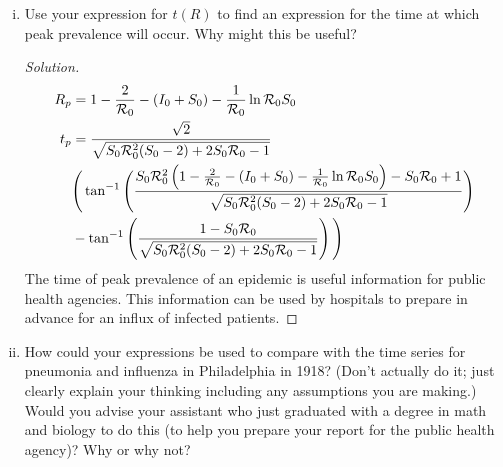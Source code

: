 \documentclass[12pt]{article}
\begin{document}
\begin{enumerate}[(a)]
\begin{enumerate}[(i)]
{\begin{proof}[Solution]
{}
\end{proof}
}

\item Use your expression for $t(R)$ to find an expression for the time at which peak prevalence will occur.  Why might this be useful?

{\color{blue}
\begin{proof}[Solution]
{\color{magenta}

\begin{align}
		R_p &= 1- \frac{2}{{\cal R}_0} - (I_0+S_0) - \frac{1}{{\cal R}_0} \ln{{\cal R}_0 S_0}  \\
		t_p &= \frac{\sqrt{2}}{\sqrt{S_0{\cal R}_0^2(S_0-2)+2S_0{\cal R}_0 -1}} \nonumber \\
		&  \Bigg ( \tan ^{-1} \Bigg ( \frac{S_0{\cal R}_0^2 \left ( 1- \frac{2}{{\cal R}_0} - (I_0+S_0) - \frac{1}{{\cal R}_0} \ln{{\cal R}_0 S_0}  \right ) - S_0{\cal R}_0 +1}{\sqrt{S_0{\cal R}_0^2(S_0-2)+2S_0{\cal R}_0 -1}} \Bigg ) \nonumber \\
		&-\tan ^{-1} \left ( \frac{1 - S_0{\cal R}_0 }{\sqrt{S_0{\cal R}_0^2(S_0-2)+2S_0{\cal R}_0 -1}} \right )  \Bigg ) 
	\end{align}
	The time of peak prevalence of an epidemic is useful information for public health agencies. This information can be used by hospitals to prepare in advance for an influx of infected patients. 

}
\end{proof}
}

\item How could your expressions be used to compare with the time series for pneumonia and influenza in Philadelphia in 1918?  (Don't actually do it; just clearly explain your thinking including any assumptions you are making.)  Would you advise your assistant who just graduated with a degree in math and biology to do this (to help you prepare your report for the public health agency)?  Why or why not?


\end{enumerate}
\end{enumerate}
\end{document}
